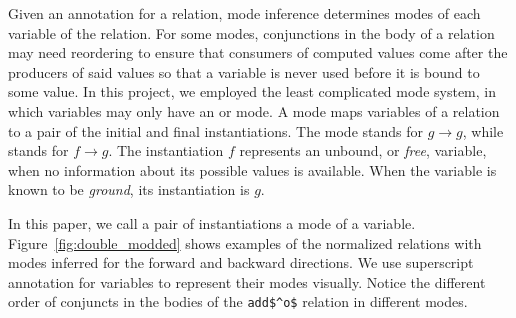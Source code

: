 Given an annotation for a relation, mode inference determines modes of each variable of the relation.
For some modes, conjunctions in the body of a relation may need reordering to ensure that consumers of computed values come after the producers of said values so that a variable is never used before it is bound to some value.
In this project, we employed the least complicated mode system, in which variables may only have an \inm or \outm mode.
A mode maps variables of a relation to a pair of the initial and final instantiations.
The mode \inm stands for $g \rightarrow g$, while \outm stands for $f \rightarrow g$.
The instantiation $f$ represents an unbound, or \emph{free}, variable, when no information about its possible values is available.
When the variable is known to be \emph{ground}, its instantiation is $g$.

In this paper, we call a pair of instantiations a mode of a variable.
Figure~\ref{fig:double_modded} shows examples of the normalized \micro relations with modes inferred for the forward and backward directions.
We use superscript annotation for variables to represent their modes visually.
Notice the different order of conjuncts in the bodies of the \lstinline{add$^o$} relation in different modes.




